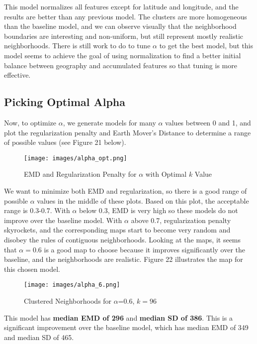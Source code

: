 \documentclass[times new roman,12pt]{article}
\begin{document}
This model normalizes all features except for latitude and longitude, and the results are better than any previous model. The clusters are more homogeneous than the baseline model, and we can observe visually that the neighborhood boundaries are interesting and non-uniform, but still represent mostly realistic neighborhoods. There is still work to do to tune $\alpha$ to get the best model, but this model seems to achieve the goal of using normalization to find a better initial balance between geography and accumulated features so that tuning is more effective. 

\subsection{Picking Optimal Alpha}
\label{reg_opt}

Now, to optimize $\alpha$, we generate models for many $\alpha$ values between 0 and 1, and plot the regularization penalty and Earth Mover's Distance to determine a range of possible values (see Figure 21 below). 

\begin{figure}[H]
\label{alpha_opt}
\centering
  \texttt{[image: images/alpha\_opt.png]}
  \caption{EMD and Regularization Penalty for $\alpha$ with Optimal $k$ Value}
  \label{fig:alpha_opt}
\end{figure}

We want to minimize both EMD and regularization, so there is a good range of possible $\alpha$ values in the middle of these plots. Based on this plot, the acceptable range is $0.3$-$0.7$. With $\alpha$ below 0.3, EMD is very high so these models do not improve over the baseline model. With $\alpha$ above 0.7, regularization penalty skyrockets, and the corresponding maps start to become very random and disobey the rules of contiguous neighborhoods. Looking at the maps, it seems that $\alpha = 0.6$ is a good map to choose because it improves significantly over the baseline, and the neighborhoods are realistic. Figure 22 illustrates the map for this chosen model.

\begin{figure}[H]
\label{alpha_6}
\centering
  \texttt{[image: images/alpha\_6.png]}
  \caption{Clustered Neighborhoods for $\alpha$=0.6, $k=96$}
  \label{fig:alpha_6}
\end{figure}

This model has \textbf{median EMD of 296} and \textbf{median SD of 386}. This is a significant improvement over the baseline model, which has median EMD of 349 and median SD of 465.
\end{document}
